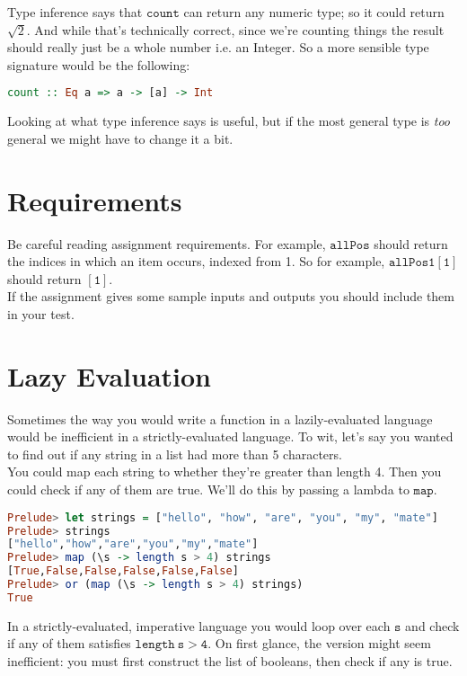 \documentclass[a4paper,12pt]{article}
\newcommand{\kwa}[1]{\mathtt{#1}}
\begin{document}
\noindent
Type inference says that $\kwa{count}$ can return any numeric type; so it could return $\sqrt 2$. And while that's technically correct, since we're counting things the result should really just be a whole number i.e. an Integer. So a more sensible type signature would be the following:

\begin{lstlisting}[language=Haskell]
count :: Eq a => a -> [a] -> Int
\end{lstlisting}

\noindent
Looking at what type inference says is useful, but if the most general type is \textit{too} general we might have to change it a bit.


\section{Requirements}

\noindent
Be careful reading assignment requirements. For example, $\kwa{allPos}$ should return the indices in which an item occurs, indexed from 1. So for example, $\kwa{allPos 1 [1]}$ should return $\kwa{[1]}$.\\

\noindent
If the assignment gives some sample inputs and outputs you should include them in your test.

\section{Lazy Evaluation}

\noindent
Sometimes the way you would write a function in a lazily-evaluated language would be inefficient in a strictly-evaluated language. To wit, let's say you wanted to find out if any string in a list had more than 5 characters. \\

\noindent
You could map each string to whether they're greater than length 4. Then you could check if any of them are true. We'll do this by passing a lambda to $\kwa{map}$.

\begin{lstlisting}[language=Haskell]
Prelude> let strings = ["hello", "how", "are", "you", "my", "mate"]
Prelude> strings
["hello","how","are","you","my","mate"]
Prelude> map (\s -> length s > 4) strings
[True,False,False,False,False,False]
Prelude> or (map (\s -> length s > 4) strings)
True
\end{lstlisting}

\noindent
In a strictly-evaluated, imperative language you would loop over each $\kwa{s}$ and check if any of them satisfies $\kwa{length~s  > 4}$. On first glance, the version might seem inefficient: you must first construct the list of booleans, then check if any is true. \\
\end{document}
